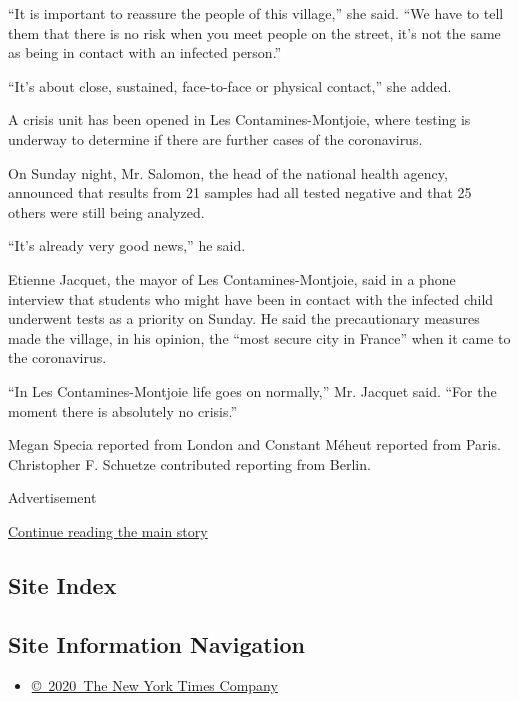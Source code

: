 ``It is important to reassure the people of this village,'' she said.
``We have to tell them that there is no risk when you meet people on the
street, it's not the same as being in contact with an infected person.''

``It's about close, sustained, face-to-face or physical contact,'' she
added.

A crisis unit has been opened in Les Contamines-Montjoie, where testing
is underway to determine if there are further cases of the coronavirus.

On Sunday night, Mr. Salomon, the head of the national health agency,
announced that results from 21 samples had all tested negative and that
25 others were still being analyzed.

``It's already very good news,'' he said.

Etienne Jacquet, the mayor of Les Contamines-Montjoie, said in a phone
interview that students who might have been in contact with the infected
child underwent tests as a priority on Sunday. He said the precautionary
measures made the village, in his opinion, the ``most secure city in
France'' when it came to the coronavirus.

``In Les Contamines-Montjoie life goes on normally,'' Mr. Jacquet said.
``For the moment there is absolutely no crisis.''

Megan Specia reported from London and Constant Méheut reported from
Paris. Christopher F. Schuetze contributed reporting from Berlin.

Advertisement

\protect\hyperlink{after-bottom}{Continue reading the main story}

\hypertarget{site-index}{%
\subsection{Site Index}\label{site-index}}

\hypertarget{site-information-navigation}{%
\subsection{Site Information
Navigation}\label{site-information-navigation}}

\begin{itemize}
\tightlist
\item
  \href{https://help.nytimes3xbfgragh.onion/hc/en-us/articles/115014792127-Copyright-notice}{©~2020~The
  New York Times Company}
\end{itemize}

